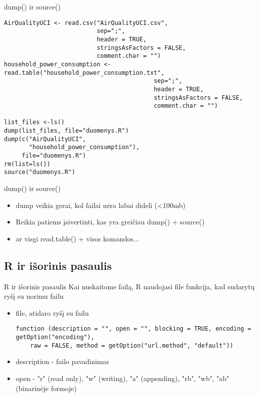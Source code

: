 \documentclass[11pt,xcolor=table]{beamer}
\begin{document}
\begin{frame}[fragile]{dump() ir source()}
\begin{lstlisting}
AirQualityUCI <- read.csv("AirQualityUCI.csv", 
                          sep=";", 
                          header = TRUE, 
                          stringsAsFactors = FALSE, 
                          comment.char = "")
household_power_consumption <- read.table("household_power_consumption.txt", 
                                          sep=";", 
                                          header = TRUE, 
                                          stringsAsFactors = FALSE, 
                                          comment.char = "")

list_files <-ls()
dump(list_files, file="duomenys.R")
dump(c("AirQualityUCI", 
       "household_power_consumption"), 
     file="duomenys.R")
rm(list=ls())
source("duomenys.R")
\end{lstlisting}
\end{frame}

\begin{frame}[fragile]{dump() ir source()}
\begin{itemize}
\item dump veikia gerai, kol failai nėra labai dideli (<100mb)
\item Reikia patiems įsivertinti, kas yra greičiau dump() + source()
\item ar visgi read.table() + visos komandos...
\end{itemize}
\end{frame}

\subsection{R ir išorinis pasaulis}

\begin{frame}[fragile]{R ir išorinis pasaulis}
Kai nuskaitome failą, R naudojasi file funkcija, kad sudarytų ryšį su norimu failu
\begin{itemize}
\item file, atidaro ryšį su failu
\begin{lstlisting}
function (description = "", open = "", blocking = TRUE, encoding = getOption("encoding"), 
    raw = FALSE, method = getOption("url.method", "default")) 
\end{lstlisting}

\item description - failo pavadinimas
\item open - "r" (read only), "w" (writing), "a" (appending), "rb", "wb", "ab" (binarinėje formoje)
\end{itemize}
\end{frame}
\end{document}
